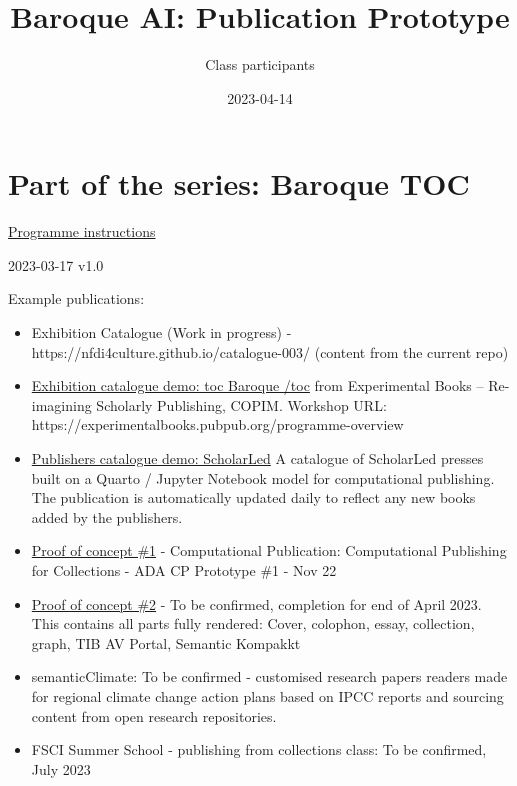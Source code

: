 \documentclass[
  letterpaper,
]{book}
\title{Baroque AI: Publication Prototype}
\author{Class participants}
\date{2023-04-14}
\renewcommand*\contentsname{Table of contents}
\newcommand\contentsname{Table of contents}
\begin{document}
\frontmatter
\maketitle
\ifdefined\Shaded\renewenvironment{Shaded}{\begin{tcolorbox}[borderline west={3pt}{0pt}{shadecolor}, enhanced, interior hidden, sharp corners, boxrule=0pt, frame hidden, breakable]}{\end{tcolorbox}}\fi

\renewcommand*\contentsname{Table of contents}
{
\setcounter{tocdepth}{2}
\tableofcontents
}
\mainmatter
{}

\hypertarget{part-of-the-series-baroque-toc}{%
\chapter{Part of the series: Baroque
TOC}\label{part-of-the-series-baroque-toc}}

\href{https://nfdi4culture.github.io/class-ADA-CP-pipeline/}{Programme
instructions}

2023-03-17 v1.0

Example publications:

\begin{itemize}
\item
  Exhibition Catalogue (Work in progress) -
  https://nfdi4culture.github.io/catalogue-003/ (content from the
  current repo)
\item
  \href{https://nfdi4culture.github.io/experimental-books-workshop/}{Exhibition
  catalogue demo: toc Baroque /toc} from Experimental Books --
  Re-imagining Scholarly Publishing, COPIM. Workshop URL:
  https://experimentalbooks.pubpub.org/programme-overview
\item
  \href{https://simonxix.github.io/scholarled_catalogue/}{Publishers
  catalogue demo: ScholarLed} A catalogue of ScholarLed presses built on
  a Quarto / Jupyter Notebook model for computational publishing. The
  publication is automatically updated daily to reflect any new books
  added by the publishers.
\item
  \href{https://nfdi4culture.github.io/cp4c/}{Proof of concept \#1} -
  Computational Publication: Computational Publishing for Collections -
  ADA CP Prototype \#1 - Nov 22
\item
  \href{https://nfdi4culture.github.io/art_catalogue_test/}{Proof of
  concept \#2} - To be confirmed, completion for end of April 2023. This
  contains all parts fully rendered: Cover, colophon, essay, collection,
  graph, TIB AV Portal, Semantic Kompakkt
\item
  semanticClimate: To be confirmed - customised research papers readers
  made for regional climate change action plans based on IPCC reports
  and sourcing content from open research repositories.
\item
  FSCI Summer School - publishing from collections class: To be
  confirmed, July 2023
\end{itemize}
\end{document}
